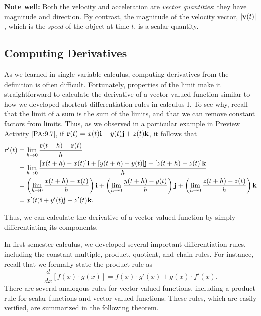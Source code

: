 {\bf Note well:} Both the velocity and acceleration are \emph{vector
  quantities}: they have magnitude and direction. By contrast, the
magnitude of the velocity vector, $| \mathbf{v}(t) |$, which is the \emph{speed} of
the object at time $t$, is a scalar quantity.

\subsection*{Computing Derivatives}

As we learned in single variable calculus, computing derivatives from
the definition is often difficult. Fortunately, properties of the
limit make it straightforward to calculate the derivative of a
vector-valued function similar to how we developed
shortcut differentiation rules in calculus I. To see why, recall that
the limit of a sum is the sum of the limits, and that we can remove
constant factors from limits. Thus, as we observed in a particular
example in Preview Activity \ref{PA:9.7}, if $\mathbf{r}(t) = x(t) \mathbf{i} + y(t)
\mathbf{j} + z(t) \mathbf{k}$, it follows that
\begin{align*} \mathbf{r}'(t) &= \lim_{h \to 0} \frac{\mathbf{r}(t+h)-\mathbf{r}(t)}{h} \\
&= \lim_{h \to 0} \frac{[x(t+h)-x(t)] \mathbf{i} + [y(t+h)-y(t)] \mathbf{j} +
[z(t+h)-z(t)] \mathbf{k}}{h} \\ &= \left(\lim_{h \to 0} \frac{x(t+h)-x(t)}{h}
\right) \mathbf{i} + \left( \lim_{h \to 0} \frac{y(t+h)-y(t)}{h} \right) \mathbf{j}
+ \left( \lim_{h \to 0} \frac{z(t+h)-z(t)}{h} \right)\mathbf{k} \\ &= x'(t)
\mathbf{i} + y'(t) \mathbf{j} + z'(t) \mathbf{k}.
\end{align*}

Thus, we can calculate the derivative of a vector-valued function by
simply differentiating its components.

\vspace*{5pt} \nin {} \vspace*{5pt}



In first-semester calculus, we developed several important
differentiation rules, including the constant multiple, product,
quotient, and chain rules.  For instance, recall that we formally
state the product rule as
$$\frac{d}{dx}[f(x) \cdot g(x)] = f(x)\cdot g'(x) + g(x)\cdot f'(x).$$ 
There are several analogous rules for vector-valued functions,
including a product rule for scalar functions and vector-valued
functions.  These rules, which are easily verified,  are summarized in
the following theorem. 

